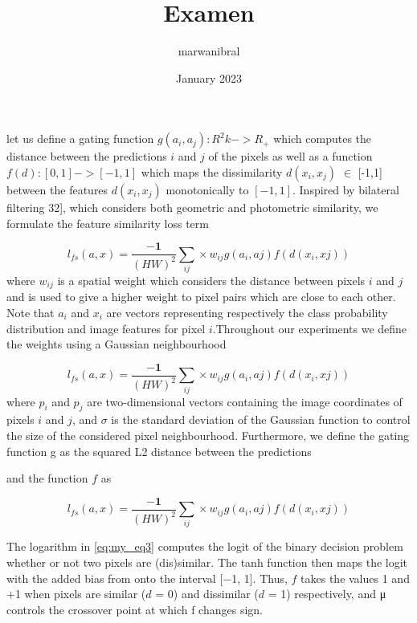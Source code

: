 \documentclass[10pt,twocolumn,letterpaper]{article}
\title{Examen}
\author{marwanibral }
\date{January 2023}
\begin{document}
\maketitle


\maketitle
let us define a gating function $g({a}_{i},{a}_{j}) : {R^2k} -> R_{+}$ which computes the distance between the predictions ${i}$ and ${j}$ of the pixels as well as a function $f(d) : [0,1] -> [-1,1]$ which maps the dissimilarity $d(x_{i}, x_{j})$ $\in$ [-1,1] between the
features $d(x_{i}, x_{j})$ monotonically to $[−1,1]$. Inspired by bilateral filtering\cite{bilareral filtering} 32], which considers both geometric and
photometric similarity, we formulate the feature similarity
loss term

\begin{equation}
    l_{fs}(a,x) = \frac{-\mathbf{1}}{(HW)^2} \sum_{ij}  \times w_{ij}g(a_{i}, a{j}) f(d(x_{i}, x{j}))  
    \label{eq:my_eq1}
\end{equation}
where $w_{ij}$ is a spatial weight which considers the distance
between pixels $i$ and $j$ and is used to give a higher weight
to pixel pairs which are close to each other. Note that $a_{i}$ and $x_{i}$ are vectors representing respectively the class probability
distribution and image features for pixel $i$.Throughout
our experiments we define the weights using a Gaussian
neighbourhood

\begin{equation}
    l_{fs}(a,x) = \frac{-\mathbf{1}}{(HW)^2} \sum_{ij}  \times w_{ij}g(a_{i}, a{j}) f(d(x_{i}, x{j})) 
    \label{eq:my_eq2}
\end{equation}
where $p_{i}$ and $p_{j}$ are two-dimensional vectors containing the
image coordinates of pixels $i$ and $j$, and $σ$ is the standard
deviation of the Gaussian function to control the size of the
considered pixel neighbourhood. Furthermore, we define
the gating function g as the squared L2 distance between the predictions


 and the function $f$ as 

\begin{equation}
    l_{fs}(a,x) = \frac{-\mathbf{1}}{(HW)^2} \sum_{ij}  \times w_{ij}g(a_{i}, a{j}) f(d(x_{i}, x{j}))  
    \label{eq:my_eq3}
\end{equation}

The logarithm in  \cref{eq:my_eq3} computes
the logit of the binary decision problem whether or not two
pixels are (dis)similar. The tanh function then maps the logit
with the added bias from  onto the interval [−1, 1]. Thus, $f$
takes the values \text{-}1 and +1 when pixels are similar ($d$ = 0)
and dissimilar ($d$ = 1) respectively, and μ controls the crossover
point at which f changes sign.
\end{document}
